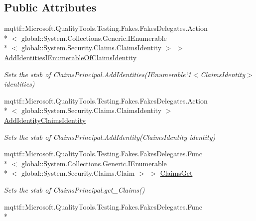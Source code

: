\subsection*{Public Attributes}
\begin{DoxyCompactItemize}
\item 
mqttf\-::\-Microsoft.\-Quality\-Tools.\-Testing.\-Fakes.\-Fakes\-Delegates.\-Action\\*
$<$ global\-::\-System.\-Collections.\-Generic.\-I\-Enumerable\\*
$<$ global\-::\-System.\-Security.\-Claims.\-Claims\-Identity $>$ $>$ \hyperlink{class_system_1_1_security_1_1_principal_1_1_fakes_1_1_stub_windows_principal_a5e929c1a6054ce5305ffcdd33ba96ddb}{Add\-Identities\-I\-Enumerable\-Of\-Claims\-Identity}
\begin{DoxyCompactList}\small\item\em Sets the stub of Claims\-Principal.\-Add\-Identities(I\-Enumerable`1$<$Claims\-Identity$>$ identities)\end{DoxyCompactList}\item 
mqttf\-::\-Microsoft.\-Quality\-Tools.\-Testing.\-Fakes.\-Fakes\-Delegates.\-Action\\*
$<$ global\-::\-System.\-Security.\-Claims.\-Claims\-Identity $>$ \hyperlink{class_system_1_1_security_1_1_principal_1_1_fakes_1_1_stub_windows_principal_ae93f788e98cb5456b80b9a78d36bb976}{Add\-Identity\-Claims\-Identity}
\begin{DoxyCompactList}\small\item\em Sets the stub of Claims\-Principal.\-Add\-Identity(\-Claims\-Identity identity)\end{DoxyCompactList}\item 
mqttf\-::\-Microsoft.\-Quality\-Tools.\-Testing.\-Fakes.\-Fakes\-Delegates.\-Func\\*
$<$ global\-::\-System.\-Collections.\-Generic.\-I\-Enumerable\\*
$<$ global\-::\-System.\-Security.\-Claims.\-Claim $>$ $>$ \hyperlink{class_system_1_1_security_1_1_principal_1_1_fakes_1_1_stub_windows_principal_a3209f6df5035483df50388a57ee74291}{Claims\-Get}
\begin{DoxyCompactList}\small\item\em Sets the stub of Claims\-Principal.\-get\-\_\-\-Claims()\end{DoxyCompactList}\item 
mqttf\-::\-Microsoft.\-Quality\-Tools.\-Testing.\-Fakes.\-Fakes\-Delegates.\-Func\\*

\end{DoxyCompactItemize}

